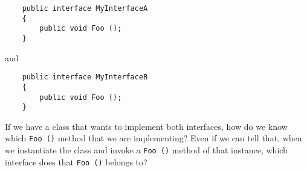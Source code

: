 \documentclass[../main.tex]{subfiles}
\begin{document}
\begin{verbatim}
    public interface MyInterfaceA
    {
        public void Foo ();
    }
\end{verbatim}

and

\begin{verbatim}
    public interface MyInterfaceB
    {
        public void Foo ();
    }
\end{verbatim}

If we have a class that wants to implement both interfaces, how do we know which
\texttt{Foo ()} method that we are implementing? Even if we can tell that, when
we instantiate the class and invoke a \texttt{Foo ()} method of that instance,
which interface does that \texttt{Foo ()} belongs to?
\end{document}
